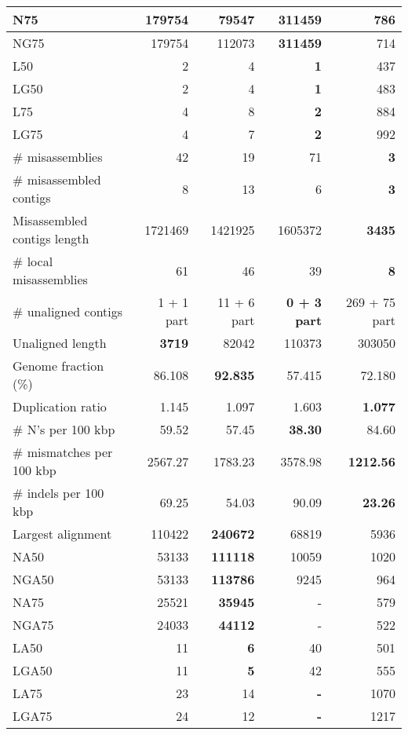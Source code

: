 \documentclass[12pt,a4paper]{article}
\begin{document}
\begin{table}[ht]
\begin{center}
\begin{tabular}{|l*{4}{|r}|}
N75 & 179754 & 79547 & {\bf 311459} & 786 \\ \hline
NG75 & 179754 & 112073 & {\bf 311459} & 714 \\ \hline
L50 & 2 & 4 & {\bf 1} & 437 \\ \hline
LG50 & 2 & 4 & {\bf 1} & 483 \\ \hline
L75 & 4 & 8 & {\bf 2} & 884 \\ \hline
LG75 & 4 & 7 & {\bf 2} & 992 \\ \hline
\# misassemblies & 42 & 19 & 71 & {\bf 3} \\ \hline
\# misassembled contigs & 8 & 13 & 6 & {\bf 3} \\ \hline
Misassembled contigs length & 1721469 & 1421925 & 1605372 & {\bf 3435} \\ \hline
\# local misassemblies & 61 & 46 & 39 & {\bf 8} \\ \hline
\# unaligned contigs & 1 + 1 part & 11 + 6 part & {\bf 0 + 3 part} & 269 + 75 part \\ \hline
Unaligned length & {\bf 3719} & 82042 & 110373 & 303050 \\ \hline
Genome fraction (\%) & 86.108 & {\bf 92.835} & 57.415 & 72.180 \\ \hline
Duplication ratio & 1.145 & 1.097 & 1.603 & {\bf 1.077} \\ \hline
\# N's per 100 kbp & 59.52 & 57.45 & {\bf 38.30} & 84.60 \\ \hline
\# mismatches per 100 kbp & 2567.27 & 1783.23 & 3578.98 & {\bf 1212.56} \\ \hline
\# indels per 100 kbp & 69.25 & 54.03 & 90.09 & {\bf 23.26} \\ \hline
Largest alignment & 110422 & {\bf 240672} & 68819 & 5936 \\ \hline
NA50 & 53133 & {\bf 111118} & 10059 & 1020 \\ \hline
NGA50 & 53133 & {\bf 113786} & 9245 & 964 \\ \hline
NA75 & 25521 & {\bf 35945} & - & 579 \\ \hline
NGA75 & 24033 & {\bf 44112} & - & 522 \\ \hline
LA50 & 11 & {\bf 6} & 40 & 501 \\ \hline
LGA50 & 11 & {\bf 5} & 42 & 555 \\ \hline
LA75 & 23 & 14 & {\bf -} & 1070 \\ \hline
LGA75 & 24 & 12 & {\bf -} & 1217 \\ \hline
\end{tabular}
\end{center}
\end{table}
\end{document}
